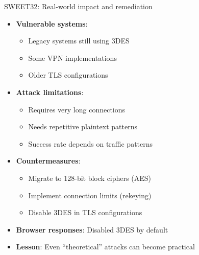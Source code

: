 \documentclass[aspectratio=169, lualatex, handout]{beamer}
\begin{document}
\begin{frame}{SWEET32: Real-world impact and remediation}
	\begin{itemize}
		\item \textbf{Vulnerable systems}:
		      \begin{itemize}
			      \item Legacy systems still using 3DES
			      \item Some VPN implementations
			      \item Older TLS configurations
		      \end{itemize}
		\item \textbf{Attack limitations}:
		      \begin{itemize}
			      \item Requires very long connections
			      \item Needs repetitive plaintext patterns
			      \item Success rate depends on traffic patterns
		      \end{itemize}
		\item \textbf{Countermeasures}:
		      \begin{itemize}
			      \item Migrate to 128-bit block ciphers (AES)
			      \item Implement connection limits (rekeying)
			      \item Disable 3DES in TLS configurations
		      \end{itemize}
		\item \textbf{Browser responses}: Disabled 3DES by default
		\item \textbf{Lesson}: Even ``theoretical'' attacks can become practical
	\end{itemize}
\end{frame}
\end{document}
